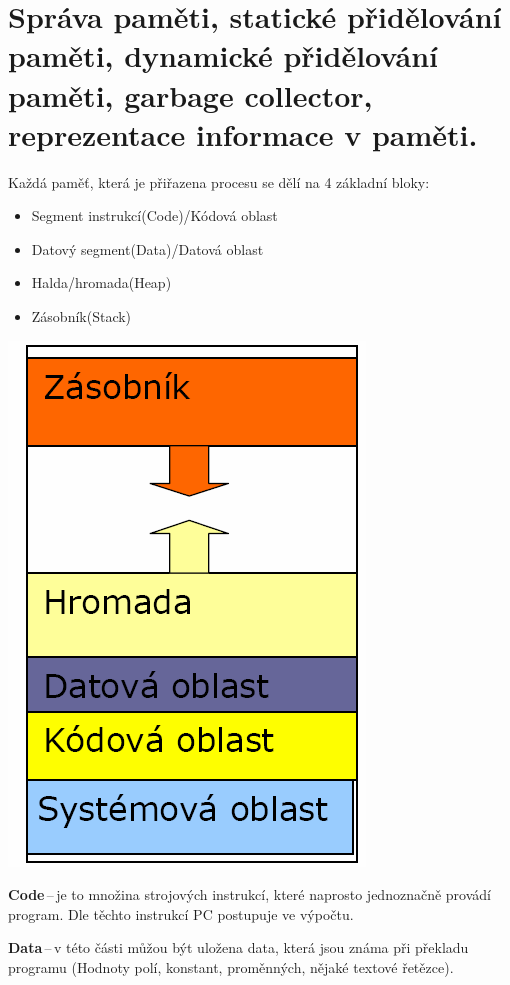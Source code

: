\section{Správa paměti, statické přidělování paměti, dynamické přidělování paměti, garbage collector, reprezentace informace v paměti.}
Každá paměť, která je přiřazena procesu se dělí na 4 základní bloky:
\begin{multicols}{2}
\begin{itemize}
    \item Segment instrukcí(Code)/Kódová oblast
    \item Datový segment(Data)/Datová oblast
    \item Halda/hromada(Heap)
    \item Zásobník(Stack)
    \vfill
\end{itemize}
\includegraphics[scale=0.3]{BPC-TIN/images/pamet.png}
\end{multicols}
\textbf{Code}\,--\,je to množina strojových instrukcí, které naprosto jednoznačně provádí program. Dle těchto instrukcí PC postupuje ve výpočtu.

\textbf{Data}\,--\,v této části můžou být uložena data, která jsou známa při překladu programu (Hodnoty polí, konstant, proměnných, nějaké textové řetězce).

